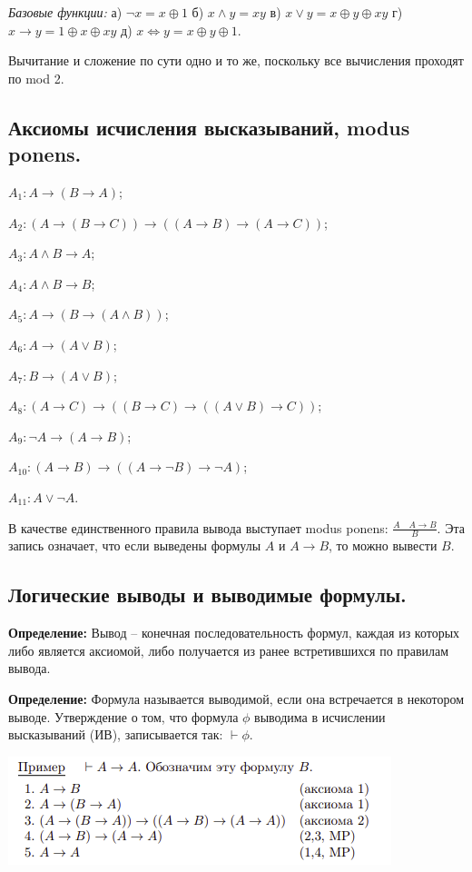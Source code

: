 \par \textit{Базовые функции:} а) $\neg x = x \oplus 1$ \quad б) $x \land y = xy$ \quad в) $x \lor y = x \oplus y \oplus xy$ \quad г) $x \to y = 1 \oplus x \oplus xy$ \quad д) $x \Leftrightarrow y = x \oplus y \oplus 1$.

Вычитание и сложение по сути одно и то же, поскольку все вычисления проходят по mod 2.

\subsection{Аксиомы исчисления высказываний, modus ponens.}

$A_{1}:A\rightarrow (B\rightarrow A)$;

$A_{2}:(A\rightarrow (B\rightarrow C))\rightarrow ((A\rightarrow B)\rightarrow (A\rightarrow C))$;

$A_{3}:A\wedge B\rightarrow A$;

$A_{4}:A\wedge B\rightarrow B$;

$A_{5}:A\rightarrow (B\rightarrow (A\wedge B))$;

$A_{6}:A\rightarrow (A\vee B)$;

$A_{7}:B\rightarrow (A\vee B)$;

$A_{8}:(A\rightarrow C)\rightarrow ((B\rightarrow C)\rightarrow ((A\vee B)\rightarrow C))$;

$A_{9}:\neg A\rightarrow (A\rightarrow B)$;

$A_{{10}}:(A\rightarrow B)\rightarrow ((A\rightarrow \neg B)\rightarrow \neg A)$;

$A_{{11}}:A\vee \neg A$.

В качестве единственного правила вывода выступает modus ponens: $\frac{A \quad A\rightarrow B}{B}$. Эта запись означает, что если выведены формулы $A$ и $A \to B$, то можно вывести $B$.

\subsection{Логические выводы и выводимые формулы.}
\textbf{Определение:} Вывод -- конечная последовательность формул, каждая из которых либо является аксиомой, либо получается из ранее встретившихся по правилам вывода.

\textbf{Определение:} Формула называется выводимой, если она встречается в некотором выводе. Утверждение о том, что формула $\phi$ выводима в исчислении высказываний (ИВ), записывается так: $\vdash \phi$. 

\begin{center}\label{a_to_a}
    \includegraphics[width=0.6\linewidth]{images/1_definitions_mp}
\end{center}


